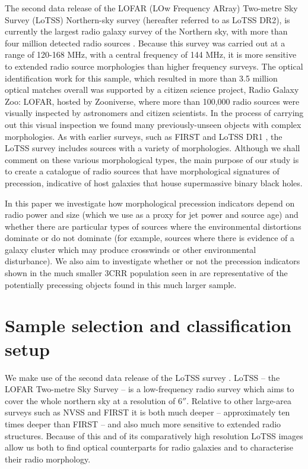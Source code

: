 \documentclass{aa}
\begin{document}
The second data release of the LOFAR (LOw Frequency ARray) Two-metre Sky Survey (LoTSS) Northern-sky survey (hereafter referred to as LoTSS DR2), is currently the largest radio galaxy survey of the Northern sky, with more than four million detected radio sources \citep{shimwell22}. Because this survey was carried out at a range of 120-168 MHz, with a central frequency of 144 MHz, it is more sensitive to extended radio source morphologies than higher frequency surveys. The optical identification work for this sample, which resulted in more than 3.5 million optical matches overall \citep{hardcastle23} was supported by a citizen science project, Radio Galaxy Zoo: LOFAR, hosted by Zooniverse, where more than 100,000 radio sources were visually inspected by astronomers and citizen scientists. In the process of carrying out this visual inspection we found many previously-unseen objects with complex morphologies. As with earlier surveys, such as FIRST and LoTSS DR1 \cite[e.g.,][]{cheung07,shimwell19,williams19}, the LoTSS survey includes sources with a variety of morphologies. Although we shall comment on these various morphological types, the main purpose of our study is to create a catalogue of radio sources that have morphological signatures of precession, indicative of host galaxies that house supermassive binary black holes.

In this paper we investigate how morphological precession indicators depend on radio power and size (which we use as a proxy for jet power and source age) and whether there are particular types of sources where the environmental distortions dominate or do not dominate (for example, sources where there is evidence of a galaxy cluster which may produce crosswinds or other environmental disturbance). We also aim to investigate whether or not the precession indicators shown in the much smaller 3CRR population seen in \cite{krause18} are representative of the potentially precessing objects found in this much larger sample. 

\section{Sample selection and classification setup}

We make use of the second data release of the LoTSS survey \citep{shimwell22}. LoTSS -- the LOFAR Two-metre Sky Survey -- \citep{shimwell17} is a low-frequency radio survey which aims to cover the whole northern sky at a resolution of $6''$. Relative to other large-area surveys such as NVSS \citep{condon98} and FIRST \citep{becker95} it is both much deeper -- approximately ten times deeper than FIRST -- and also much more sensitive to extended radio structures. Because of this and of its comparatively high resolution LoTSS images allow us both to find optical counterparts for radio galaxies and to characterise their radio morphology.
\end{document}
